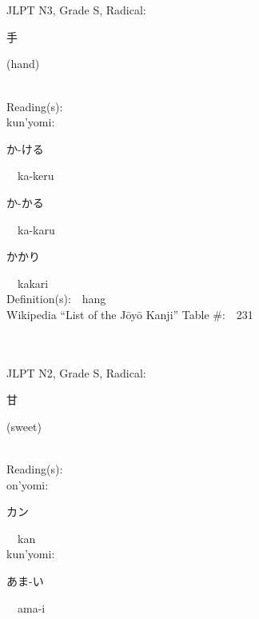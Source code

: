\begin{multicols}{2}
\ \ \\
{\fontsize{34pt}{40pt}  }\ \ \\  %
{JLPT N3, Grade S, Radical:\ \ {\begin{CJK}{UTF8}{min} 手 \end{CJK}} (hand) } \\
Reading(s):\ \ \\
{\hspace*{1em}}kun'yomi:\ \ \\
{\hspace*{2em}}{\begin{CJK}{UTF8}{min} か-ける \end{CJK}}\ \ ka-keru\ \ \\
{\hspace*{2em}}{\begin{CJK}{UTF8}{min} か-かる \end{CJK}}\ \ ka-karu\ \ \\
{\hspace*{2em}}{\begin{CJK}{UTF8}{min} かかり \end{CJK}}\ \ kakari\ \ \\
Definition(s):\ \ hang \\
Wikipedia ``List of the J\=oy\=o Kanji'' Table \#:\ \ 231 \\
\ \ \\
{\fontsize{34pt}{40pt}  }\ \ \\  %
{JLPT N2, Grade S, Radical:\ \ {\begin{CJK}{UTF8}{min} 甘 \end{CJK}} (sweet) } \\
Reading(s):\ \ \\
{\hspace*{1em}}on'yomi:\ \ \\
{\hspace*{2em}}{\begin{CJK}{UTF8}{min} カン \end{CJK}}\ \ kan\ \ \\
{\hspace*{1em}}kun'yomi:\ \ \\
{\hspace*{2em}}{\begin{CJK}{UTF8}{min} あま-い \end{CJK}}\ \ ama-i\ \ \\

\end{multicols}
